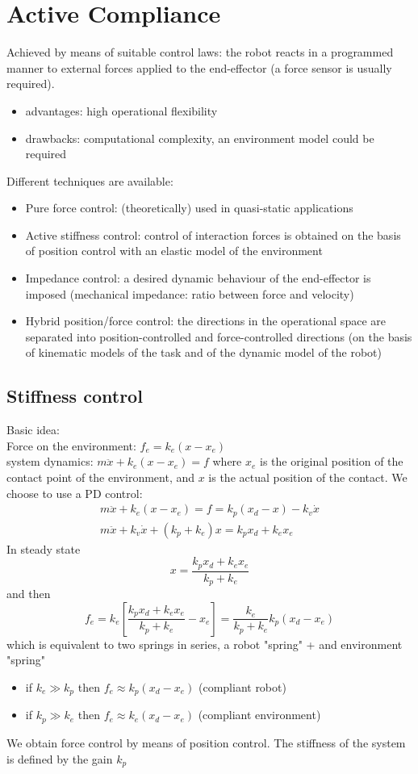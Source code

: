 \documentclass{book}
\begin{document}
\section{Active Compliance}
Achieved by means of suitable control laws: the robot reacts in a programmed manner to external forces applied to the end-effector (a force sensor is usually required). 

\begin{itemize}
    \item advantages: high operational flexibility
    \item drawbacks: computational complexity, an environment model could be required
\end{itemize}

Different techniques are available: 
\begin{itemize}
    \item Pure force control: (theoretically) used in quasi-static applications 
    \item Active stiffness control: control of interaction forces is obtained on the basis of position control with an elastic model of the environment 
    \item Impedance control: a desired dynamic behaviour of the end-effector is imposed (mechanical impedance: ratio between force and velocity)
    \item Hybrid position/force control: the directions in the operational space are separated into position-controlled and force-controlled directions (on the basis of kinematic models of the task and of the dynamic model of the robot)
\end{itemize}

\subsection{Stiffness control}
Basic idea: \\
Force on the environment: $f_e = k_e(x-x_e)$\\
system dynamics: $m\ddot{x}+k_e(x-x_e)=f$
where $x_e$ is the original position of the contact point of the environment, and $x$ is the actual position of the contact. We choose to use a PD control:
\begin{gather*}
    m\ddot{x}+k_e(x-x_e)=f=k_p(x_d-x)-k_v\dot{x}\\
    m\ddot{x}+k_v\dot{x}+(k_p+k_e)x=k_px_d+k_ex_e
\end{gather*}
In steady state 
\[
    x=\displaystyle\frac{k_px_d+k_ex_e}{k_p+k_e}
\]
and then
\[
    f_e = k_e\left[\displaystyle\frac{k_px_d+k_ex_e}{k_p+k_e}-x_e\right] = \displaystyle\frac{k_e}{k_p+k_e}k_p(x_d-x_e)
\]
which is equivalent to two springs in series, a robot "spring" + and environment "spring"
\begin{itemize}
    \item if $k_e \gg k_p$ then $f_e\approx k_p(x_d-x_e)$ (compliant robot)
    \item if $k_p \gg k_e$ then $f_e\approx k_e(x_d-x_e)$ (compliant environment)
\end{itemize}
We obtain force control by means of position control. The stiffness of the system is defined by the gain $k_p$
\end{document}
